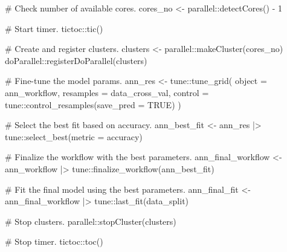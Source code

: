 \documentclass[
  letterpaper,
  DIV=11,
  numbers=noendperiod]{scrartcl}
\newenvironment{Shaded}{\begin{snugshade}}{\end{snugshade}}
\newcommand{\AttributeTok}[1]{\textcolor[rgb]{0.40,0.45,0.13}{#1}}
\newcommand{\CommentTok}[1]{\textcolor[rgb]{0.37,0.37,0.37}{#1}}
\newcommand{\ConstantTok}[1]{\textcolor[rgb]{0.56,0.35,0.01}{#1}}
\newcommand{\DecValTok}[1]{\textcolor[rgb]{0.68,0.00,0.00}{#1}}
\newcommand{\FunctionTok}[1]{\textcolor[rgb]{0.28,0.35,0.67}{#1}}
\newcommand{\NormalTok}[1]{\textcolor[rgb]{0.00,0.23,0.31}{#1}}
\newcommand{\OtherTok}[1]{\textcolor[rgb]{0.00,0.23,0.31}{#1}}
\newcommand{\SpecialCharTok}[1]{\textcolor[rgb]{0.37,0.37,0.37}{#1}}
\newcommand{\StringTok}[1]{\textcolor[rgb]{0.13,0.47,0.30}{#1}}
\begin{document}
\begin{Shaded}
\begin{Highlighting}[]
\CommentTok{\#\textquotesingle{} Check number of available cores.}
\NormalTok{cores\_no }\OtherTok{\textless{}{-}}\NormalTok{ parallel}\SpecialCharTok{::}\FunctionTok{detectCores}\NormalTok{() }\SpecialCharTok{{-}} \DecValTok{1}

\CommentTok{\#\textquotesingle{} Start timer.}
\NormalTok{tictoc}\SpecialCharTok{::}\FunctionTok{tic}\NormalTok{()}

\CommentTok{\# Create and register clusters.}
\NormalTok{clusters }\OtherTok{\textless{}{-}}\NormalTok{ parallel}\SpecialCharTok{::}\FunctionTok{makeCluster}\NormalTok{(cores\_no)}
\NormalTok{doParallel}\SpecialCharTok{::}\FunctionTok{registerDoParallel}\NormalTok{(clusters)}

\CommentTok{\# Fine{-}tune the model params.}
\NormalTok{ann\_res }\OtherTok{\textless{}{-}}\NormalTok{ tune}\SpecialCharTok{::}\FunctionTok{tune\_grid}\NormalTok{(}
  \AttributeTok{object =}\NormalTok{ ann\_workflow,}
  \AttributeTok{resamples =}\NormalTok{ data\_cross\_val,}
  \AttributeTok{control =}\NormalTok{ tune}\SpecialCharTok{::}\FunctionTok{control\_resamples}\NormalTok{(}\AttributeTok{save\_pred =} \ConstantTok{TRUE}\NormalTok{)}
\NormalTok{)}

\CommentTok{\# Select the best fit based on accuracy.}
\NormalTok{ann\_best\_fit }\OtherTok{\textless{}{-}} 
\NormalTok{  ann\_res }\SpecialCharTok{|\textgreater{}} 
\NormalTok{  tune}\SpecialCharTok{::}\FunctionTok{select\_best}\NormalTok{(}\AttributeTok{metric =} \StringTok{\textquotesingle{}accuracy\textquotesingle{}}\NormalTok{)}

\CommentTok{\# Finalize the workflow with the best parameters.}
\NormalTok{ann\_final\_workflow }\OtherTok{\textless{}{-}} 
\NormalTok{  ann\_workflow }\SpecialCharTok{|\textgreater{}}
\NormalTok{  tune}\SpecialCharTok{::}\FunctionTok{finalize\_workflow}\NormalTok{(ann\_best\_fit)}

\CommentTok{\# Fit the final model using the best parameters.}
\NormalTok{ann\_final\_fit }\OtherTok{\textless{}{-}} 
\NormalTok{  ann\_final\_workflow }\SpecialCharTok{|\textgreater{}} 
\NormalTok{  tune}\SpecialCharTok{::}\FunctionTok{last\_fit}\NormalTok{(data\_split)}

\CommentTok{\# Stop clusters.}
\NormalTok{parallel}\SpecialCharTok{::}\FunctionTok{stopCluster}\NormalTok{(clusters)}

\CommentTok{\# Stop timer.}
\NormalTok{tictoc}\SpecialCharTok{::}\FunctionTok{toc}\NormalTok{()}
\end{Highlighting}
\end{Shaded}
\end{document}
